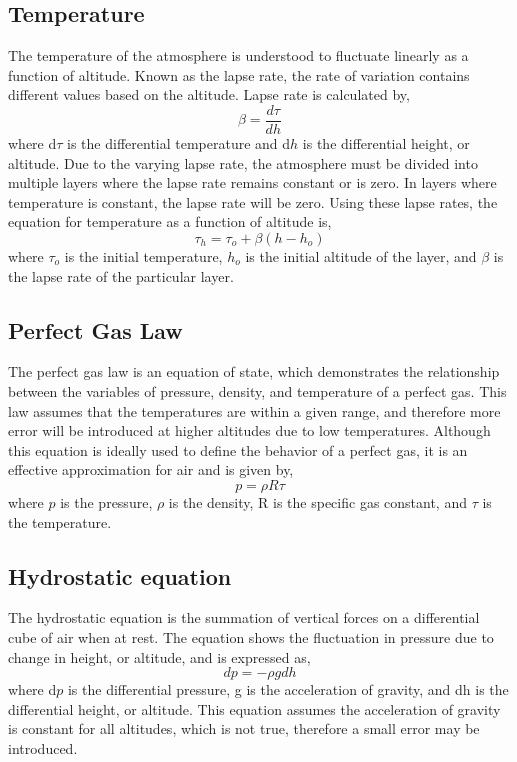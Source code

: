 \documentclass[12pt]{report}
\begin{document}
\subsection{Temperature}
The temperature of the atmosphere is understood to fluctuate linearly as a function of altitude. Known as the lapse rate, the rate of variation contains different values based on the altitude. Lapse rate is calculated by,
\begin{equation}
	\beta = \frac{d\tau}{dh}
	\label{equation:beta}
\end{equation}
where d\(\tau\) is the differential temperature and d\(h\) is the differential height, or altitude. Due to the varying lapse rate, the atmosphere must be divided into multiple layers where the lapse rate remains constant or is zero. In layers where temperature is constant, the lapse rate will be zero. Using these lapse rates, the equation for temperature as a function of altitude is,
\begin{equation}
	\tau_{h} = \tau_{o} + \beta(h - h_{o})
	\label{equation:tauh}
\end{equation}
where \(\tau_{o}\) is the initial temperature, \(h_{o}\) is the initial altitude of the layer, and \(\beta\) is the lapse rate of the particular layer.

\subsection{Perfect Gas Law}
The perfect gas law is an equation of state, which demonstrates the relationship between the variables of pressure, density, and temperature of a perfect gas. This law assumes that the temperatures are within a given range, and therefore more error will be introduced at higher altitudes due to low temperatures. Although this equation is ideally used to define the behavior of a perfect gas, it is an effective approximation for air and is given by,
\begin{equation}
	p = \rho R \tau
	\label{equation:pressure}
\end{equation}
where \(p\) is the pressure, \(\rho\) is the density, R is the specific gas constant, and \(\tau\) is the temperature.

\subsection{Hydrostatic equation}
The hydrostatic equation is the summation of vertical forces on a differential cube of air when at rest. The equation shows the fluctuation in pressure due to change in height, or altitude, and is expressed as,
\begin{equation}
	dp = -\rho gdh
	\label{equation:dpressure}
\end{equation}
where d\(p\) is the differential pressure, g is the acceleration of gravity, and dh is the differential height, or altitude. This equation assumes the acceleration of gravity is constant for all altitudes, which is not true, therefore a small error may be introduced. 
\end{document}
